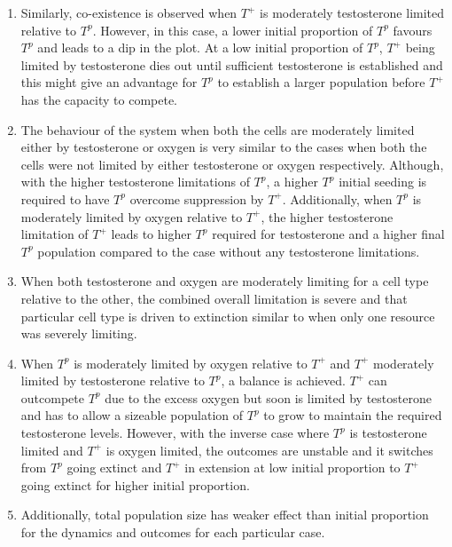 \begin{enumerate}
  \item Similarly, co-existence is observed when $T^+$ is moderately testosterone limited relative to $T^p$. However, in this case, a lower initial proportion of $T^p$ favours $T^p$ and leads to a dip in the plot. At a low initial proportion of $T^p$, $T^+$ being limited by testosterone dies out until sufficient testosterone is established and this might give an advantage for $T^p$ to establish a larger population before $T^+$ has the capacity to compete.
  \item The behaviour of the system when both the cells are moderately limited either by testosterone or oxygen is very similar to the cases when both the cells were not limited by either testosterone or oxygen respectively. Although, with the higher testosterone limitations of $T^p$, a higher $T^p$ initial seeding is required to have $T^p$ overcome suppression by $T^+$. Additionally, when $T^p$ is moderately limited by oxygen relative to $T^+$, the higher testosterone limitation of $T^+$ leads to higher $T^p$ required for testosterone and a higher final $T^p$ population compared to the case without any testosterone limitations.
  \item When both testosterone and oxygen are moderately limiting for a cell type relative to the other, the combined overall limitation is severe and that particular cell type is driven to extinction similar to when only one resource was severely limiting.
  \item When $T^p$ is moderately limited by oxygen relative to $T^+$ and $T^+$ moderately limited by testosterone relative to $T^p$, a balance is achieved. $T^+$ can outcompete $T^p$ due to the excess oxygen but soon is limited by testosterone and has to allow a sizeable population of $T^p$ to grow to maintain the required testosterone levels. However, with the inverse case where $T^p$ is testosterone limited and $T^+$ is oxygen limited, the outcomes are unstable and it switches from $T^p$ going extinct and $T^+$ in extension at low initial proportion to $T^+$ going extinct for higher initial proportion.
  \item Additionally, total population size has weaker effect than initial proportion for the dynamics and outcomes for each particular case.
\end{enumerate}

